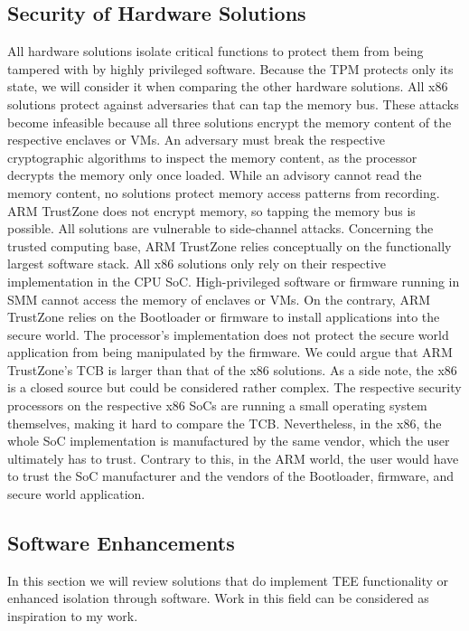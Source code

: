 \subsection{Security of Hardware Solutions}
All hardware solutions isolate critical functions to protect them from being
tampered with by highly privileged software. Because the TPM protects only its
state, we will consider it when comparing the other hardware solutions. All x86
solutions protect against adversaries that can tap the memory bus. These attacks
become infeasible because all three solutions encrypt the memory content of the
respective enclaves or VMs. An adversary must break the respective cryptographic
algorithms to inspect the memory content, as the processor decrypts the memory
only once loaded. While an advisory cannot read the memory content, no solutions
protect memory access patterns from recording. ARM TrustZone does not encrypt
memory, so tapping the memory bus is possible. All solutions are vulnerable to
side-channel attacks. Concerning the trusted computing base, ARM TrustZone
relies conceptually on the functionally largest software stack. All x86
solutions only rely on their respective implementation in the CPU SoC.
High-privileged software or firmware running in SMM cannot access the memory of
enclaves or VMs. On the contrary, ARM TrustZone relies on the Bootloader or
firmware to install applications into the secure world. The processor's
implementation does not protect the secure world application from being
manipulated by the firmware. We could argue that ARM TrustZone's TCB is larger
than that of the x86 solutions. As a side note, the x86 is a closed source but
could be considered rather complex. The respective security processors on the
respective x86 SoCs are running a small operating system themselves, making it
hard to compare the TCB. Nevertheless, in the x86, the whole SoC implementation
is manufactured by the same vendor, which the user ultimately has to trust.
Contrary to this, in the ARM world, the user would have to trust the SoC
manufacturer and the vendors of the Bootloader, firmware, and secure world
application.\\

\subsection{Software Enhancements}
In this section we will review solutions that do implement TEE functionality or
enhanced isolation through software. Work in this field can be considered as
inspiration to my work.

